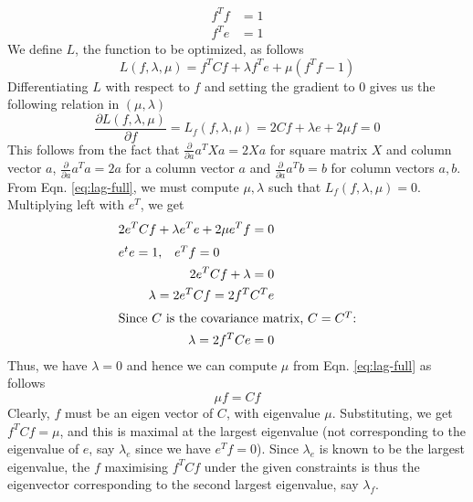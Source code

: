 \documentclass[11pt]{article}
\begin{document}
\begin{enumerate}
\begin{equation}
\begin{split}
f^Tf &= 1 \\
f^Te &= 1
\end{split}
\end{equation}
We define $L$, the function to be optimized, as follows
\begin{equation}
\label{eq:lag-full}
L(f, \lambda, \mu) = f^TCf + \lambda f^Te + \mu(f^Tf - 1)
\end{equation}
Differentiating $L$ with respect to $f$ and setting the gradient to $0$ gives us the following relation in $(\mu, \lambda)$
\begin{equation}
\frac{\partial L(f, \lambda, \mu)}{\partial f} = L_f(f, \lambda, \mu) = 2Cf + \lambda e + 2\mu f = 0
\end{equation}
This follows from the fact that $\frac{\partial}{\partial a}a^TXa = 2Xa$ for square matrix $X$ and column vector $a$, $\frac{\partial}{\partial a}a^Ta = 2a$ for a column vector $a$ and $\frac{\partial}{\partial a}a^Tb = b$ for column vectors $a, b$.\\
\hspace*{1em} From Eqn. \ref{eq:lag-full}, we must compute $\mu, \lambda$ such that $L_f(f, \lambda, \mu) = 0$. Multiplying left with $e^T$, we get
\begin{align}
2e^TCf + \lambda e^Te + 2\mu e^Tf = 0 \\
\shortintertext{$e^te = 1,\;\;\;e^Tf = 0$}
2e^TCf + \lambda = 0 \\
\lambda = 2e^TCf = 2f^TC^Te \\
\shortintertext{Since $C$ is the covariance matrix, $C = C^T$:}
\lambda = 2f^TCe = 0
\end{align}
Thus, we have $\lambda = 0$ and hence we can compute $\mu$ from Eqn. \ref{eq:lag-full} as follows
\begin{equation}
\mu f = Cf
\end{equation}
Clearly, $f$ must be an eigen vector of $C$, with eigenvalue $\mu$. Substituting, we get $f^TCf = \mu$, and this is maximal at the largest eigenvalue (not corresponding to the eigenvalue of $e$, say $\lambda_e$ since we have $e^Tf=0$). Since $\lambda_e$ is known to be the largest eigenvalue, the $f$ maximising $f^TCf$ under the given constraints is thus the eigenvector corresponding to the second largest eigenvalue, say $\lambda_f$.

\end{enumerate}
\end{document}
